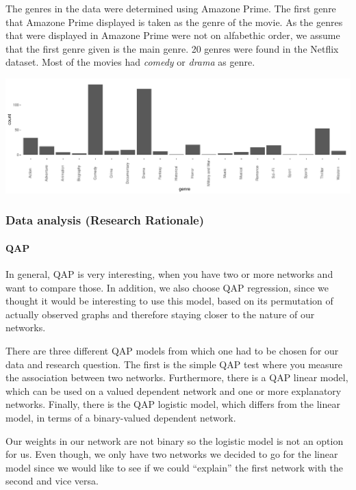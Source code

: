 \documentclass[
  english,
  man,floatsintext]{apa6}
\let\oldparagraph\paragraph
\renewcommand{\paragraph}[1]{\oldparagraph{#1}\mbox{}}
\begin{document}
The genres in the data were determined using Amazone Prime. The first genre that Amazone Prime displayed is taken as the genre of the movie. As the genres that were displayed in Amazone Prime were not on alfabethic order, we assume that the first genre given is the main genre. 20 genres were found in the Netflix dataset. Most of the movies had \emph{comedy} or \emph{drama} as genre.

\includegraphics{SNA4DSprojectReport_files/figure-latex/unnamed-chunk-6-1.pdf}

\hypertarget{data-analysis-research-rationale}{%
\subsubsection{Data analysis (Research Rationale)}\label{data-analysis-research-rationale}}

\hypertarget{qap}{%
\paragraph{QAP}\label{qap}}

In general, QAP is very interesting, when you have two or more networks and want to compare those. In addition, we also choose QAP regression, since we thought it would be interesting to use this model, based on its permutation of actually observed graphs and therefore staying closer to the nature of our networks.

There are three different QAP models from which one had to be chosen for our data and research question. The first is the simple QAP test where you measure the association between two networks. Furthermore, there is a QAP linear model, which can be used on a valued dependent network and one or more explanatory networks. Finally, there is the QAP logistic model, which differs from the linear model, in terms of a binary-valued dependent network.

Our weights in our network are not binary so the logistic model is not an option for us. Even though, we only have two networks we decided to go for the linear model since we would like to see if we could ``explain'' the first network with the second and vice versa.
\end{document}
